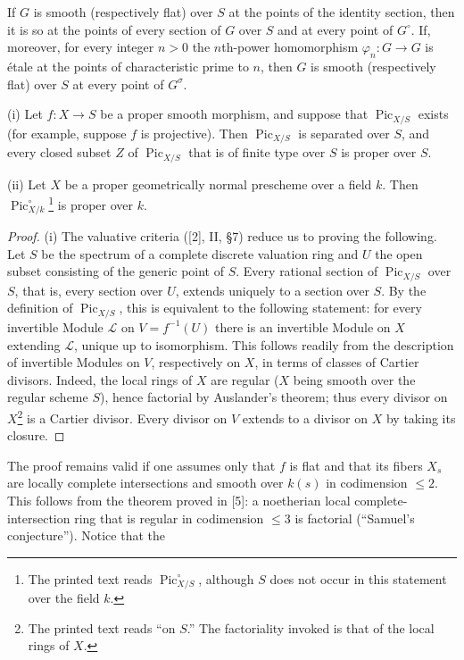  If $G$ is smooth (respectively flat) over $S$ at the
points of the identity section, then it is so at the points of every section
of $G$ over $S$ and at every point of $G^\circ$. If, moreover, for every
integer $n>0$ the $n$th-power homomorphism
$\varphi_n:G\longrightarrow G$ is étale at the points of characteristic prime
to $n$, then $G$ is smooth (respectively flat) over $S$ at every point of
$G^\sigma$.



\noindent(i) Let $f:X\longrightarrow S$ be a proper smooth morphism, and
suppose that $\operatorname{Pic}_{X/S}$ exists (for example, suppose $f$ is
projective). Then $\operatorname{Pic}_{X/S}$ is separated over $S$, and every
closed subset $Z$ of $\operatorname{Pic}_{X/S}$ that is of finite type over
$S$ is proper over $S$.

\noindent(ii) Let $X$ be a proper geometrically normal prescheme over a field
$k$. Then $\operatorname{Pic}_{X/k}^\circ$\footnote{The printed text reads
$\operatorname{Pic}_{X/S}^\circ$, although $S$ does not occur in this
statement over the field $k$.} is proper over $k$.

\begin{proof}
(i) The valuative criteria ([2], II, §7) reduce us to proving the following. Let
$S$ be the spectrum of a complete discrete valuation ring and $U$ the open
subset consisting of the generic point of $S$. Every rational section of
$\operatorname{Pic}_{X/S}$ over $S$, that is, every section over $U$, extends
uniquely to a section over $S$. By the definition of
$\operatorname{Pic}_{X/S}$, this is equivalent to the following statement: for
every invertible Module $\mathcal L$ on $V=f^{-1}(U)$ there is an invertible
Module on $X$ extending $\mathcal L$, unique up to isomorphism. This follows
readily from the description of invertible Modules on $V$, respectively on
$X$, in terms of classes of Cartier divisors. Indeed, the local rings of $X$
are regular ($X$ being smooth over the regular scheme $S$), hence factorial by
Auslander's theorem; thus every divisor on $X$\footnote{The printed text reads
“on $S$.” The factoriality invoked is that of the local rings of $X$.} is a
Cartier divisor. Every divisor on $V$ extends to a divisor on $X$ by taking its
closure.
\end{proof}

 The proof remains valid if one assumes only that $f$ is
flat and that its fibers $X_s$ are locally complete intersections and smooth
over $k(s)$ in codimension $\leq2$. This follows from the theorem proved in
[5]: a noetherian local complete-intersection ring that is regular in
codimension $\leq3$ is factorial (“Samuel's conjecture”). Notice that the

